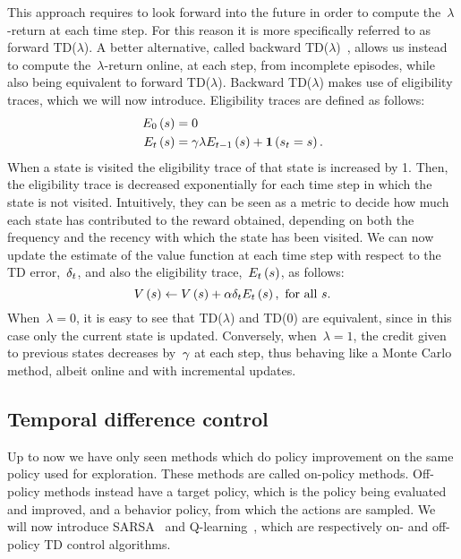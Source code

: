 This approach requires to look forward into the future in order to compute the~${\lambda}$-return at each time step. For this reason it is more specifically referred to as forward TD(${\lambda}$). A better alternative, called backward TD(${\lambda}$)~\cite{vanseijen2014}, allows us instead to compute the~${\lambda}$-return online, at each step, from incomplete episodes, while also being equivalent to forward TD(${\lambda}$). Backward TD(${\lambda}$) makes use of eligibility traces, which we will now introduce. Eligibility traces are defined as follows:
\begin{equation}
\begin{split}
    \trace_{0}\left(\state\right)&=0 \\
    \trace_{\timestep}\left(\state\right)&=\discount\lambda\trace_{\timestep-1}\left(\state\right)+\mathbf{1}\left(\randomstate_{\timestep}=\state\right).
\end{split}
\end{equation}
When a state is visited the eligibility trace of that state is increased by 1. Then, the eligibility trace is decreased exponentially for each time step in which the state is not visited. Intuitively, they can be seen as a metric to decide how much each state has contributed to the reward obtained, depending on both the frequency and the recency with which the state has been visited. We can now update the estimate of the value function at each time step with respect to the TD error,~${\delta_{t}}$, and also the eligibility trace,~${\trace_{\timestep}\left(\state\right)}$, as follows:
\begin{equation} \label{eq:td_lambda}
	\estimatestatevalue\left(\state\right)\gets\estimatestatevalue\left(\state\right)+\robbinsmonro\tderror_{\timestep}\trace_{\timestep}\left(\state\right),~\textnormal{for all}~\state.
\end{equation}
When~${\lambda=0}$, it is easy to see that TD(${\lambda}$) and TD(0) are equivalent, since in this case only the current state is updated. Conversely, when~${\lambda=1}$, the credit given to previous states decreases by~${\gamma}$ at each step, thus behaving like a Monte Carlo method, albeit online and with incremental updates.

\subsection{Temporal difference control}
Up to now we have only seen methods which do policy improvement on the same policy used for exploration. These methods are called on-policy methods. Off-policy methods instead have a target policy, which is the policy being evaluated and improved, and a behavior policy, from which the actions are sampled. We will now introduce SARSA~{\cite{rummery1994}} and Q-learning~{\cite{watkins1989learning}}, which are respectively on- and off-policy TD control algorithms.

